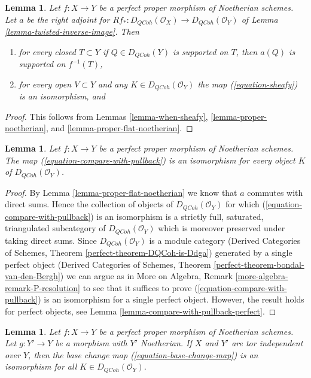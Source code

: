 \documentclass{stacks-project}
\theoremstyle{plain}
\newtheorem{lemma}[subsection]{Lemma}
\theoremstyle{definition}
\theoremstyle{remark}
\numberwithin{equation}{subsection}
\def\QCoh{\mathit{QCoh}}
\begin{document}
\begin{lemma}
\label{lemma-proper-flat-noetherian-relative}
Let $f : X \to Y$ be a perfect proper morphism of Noetherian schemes.
Let $a$ be the right adjoint for
$Rf_* : D_\QCoh(\mathcal{O}_X) \to D_\QCoh(\mathcal{O}_Y)$ of
Lemma \ref{lemma-twisted-inverse-image}. Then
\begin{enumerate}
\item for every closed $T \subset Y$ if $Q \in D_\QCoh(Y)$ is supported on $T$,
then $a(Q)$ is supported on $f^{-1}(T)$,
\item for every open $V \subset Y$ and any $K \in D_\QCoh(\mathcal{O}_Y)$
the map (\ref{equation-sheafy}) is an isomorphism, and
\end{enumerate}
\end{lemma}

\begin{proof}
This follows from Lemmas \ref{lemma-when-sheafy},
\ref{lemma-proper-noetherian}, and
\ref{lemma-proper-flat-noetherian}.
\end{proof}

\begin{lemma}
\label{lemma-compare-with-pullback-flat-proper-noetherian}
Let $f : X \to Y$ be a perfect proper morphism of Noetherian
schemes. The map (\ref{equation-compare-with-pullback}) is an isomorphism
for every object $K$ of $D_\QCoh(\mathcal{O}_Y)$.
\end{lemma}

\begin{proof}
By Lemma \ref{lemma-proper-flat-noetherian} we know that $a$ commutes
with direct sums. Hence the collection of objects of
$D_\QCoh(\mathcal{O}_Y)$ for which (\ref{equation-compare-with-pullback})
is an isomorphism is a strictly full, saturated, triangulated
subcategory of $D_\QCoh(\mathcal{O}_Y)$ which is moreover
preserved under taking direct sums. Since $D_\QCoh(\mathcal{O}_Y)$
is a module category (Derived Categories of Schemes, Theorem
\ref{perfect-theorem-DQCoh-is-Ddga}) generated by a single
perfect object (Derived Categories of Schemes, Theorem
\ref{perfect-theorem-bondal-van-den-Bergh})
we can argue as in
More on Algebra, Remark \ref{more-algebra-remark-P-resolution}
to see that it suffices to prove (\ref{equation-compare-with-pullback})
is an isomorphism for a single perfect object.
However, the result holds for perfect objects, see
Lemma \ref{lemma-compare-with-pullback-perfect}.
\end{proof}

\begin{lemma}
\label{lemma-proper-perfect-base-change}
Let $f : X \to Y$ be a perfect proper morphism of Noetherian schemes.
Let $g : Y' \to Y$ be a morphism with $Y'$ Noetherian. If $X$ and
$Y'$ are tor independent over $Y$, then the base
change map (\ref{equation-base-change-map}) is an isomorphism
for all $K \in D_\QCoh(\mathcal{O}_Y)$.
\end{lemma}
\end{document}

